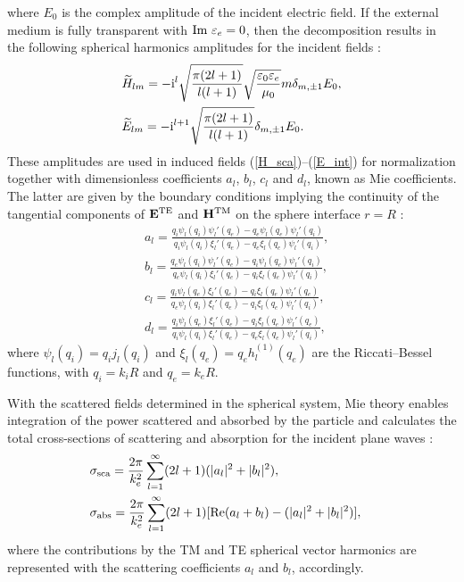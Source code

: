 \documentclass[aps,prb,reprint]{revtex4-2}
\renewcommand{\vec}[1]{{\bf #1}}
\renewcommand{\i}{{\rm i}}
\begin{document}
where $E_0$ is the complex amplitude of the incident electric field. If the external medium is fully transparent with ${\rm Im}~\varepsilon_e=0$, then the decomposition results in the following spherical harmonics amplitudes for the incident fields \cite{Li:2014}: 
\begin{eqnarray}
	&\displaystyle 
	\widetilde{H}_{lm}=-\i ^{l}\sqrt{\frac{\pi(2l+1)}{l(l+1)}}\sqrt\frac{\varepsilon_0\varepsilon_e}{\mu_0}m\delta_{m,\pm1}E_0,\\
	&\displaystyle
	\widetilde{E}_{lm}=-\i ^{l+1}\sqrt{\frac{\pi(2l+1)}{l(l+1)}}\delta_{m,\pm1}E_0.
\end{eqnarray}
These amplitudes are used in induced fields (\ref{H_sca})--(\ref{E_int}) for normalization together with dimensionless  coefficients $a_{l}$, $b_{l}$, $c_{l}$ and $d_{l}$, known as Mie coefficients. The latter are given by the boundary conditions implying the continuity of the tangential components of $\vec E^{\rm TE}$ and $\vec H^{\rm TM}$ on the sphere interface $r=R$ \cite{Stratton:2007,Jackson:1999,Bohren:1998}:
\begin{eqnarray}
	&\displaystyle 
	a_{l}=\frac{q_i\psi_l(q_i)\psi_l'(q_e)-q_e\psi_l(q_e)\psi_l'(q_i)}
	{q_i\psi_l(q_i)\xi_l'(q_e)-q_e\xi_l(q_e)\psi_l'(q_i)},
\label{S:a_l}\\
	&\displaystyle 
	b_{l}=\frac{q_e\psi_l(q_i)\psi_l'(q_e)-q_i\psi_l(q_e)\psi_l'(q_i)}
	{q_e\psi_l(q_i)\xi_l'(q_e)-q_i\xi_l(q_e)\psi_l'(q_i)},
\label{S:b_l}\\
	&\displaystyle 
	c_{l}=\frac{q_i\psi_l(q_e)\xi_l'(q_e)-q_i\xi_l(q_e)\psi_l'(q_e)}
	{q_e\psi_l(q_i)\xi_l'(q_e)-q_i\xi_l(q_e)\psi_l'(q_i)},
\label{S:c_l}\\
	&\displaystyle 
	d_{l}=\frac{q_i\psi_l(q_e)\xi_l'(q_e)-q_i\xi_l(q_e)\psi_l'(q_e)}
	{q_i\psi_l(q_i)\xi_l'(q_e)-q_e\xi_l(q_e)\psi_l'(q_i)},
\label{S:d_l}
\end{eqnarray}
where $\psi_l(q_i)=q_ij_l(q_i)$ and $\xi_l(q_e)=q_eh_l^{(1)}(q_e)$ are the Riccati--Bessel functions, with $q_i=k_i R$ and $q_e=k_e R$.

With the scattered fields determined in the spherical system, Mie theory enables integration of the power scattered and absorbed by the particle and calculates the total cross-sections of scattering and absorption for the incident plane waves \cite{Stratton:2007,Jackson:1999,Bohren:1998}: 
\begin{eqnarray}
	&\displaystyle 
	\sigma_{\rm sca}=
	\frac{2\pi}{k_e^2}\sum\limits_{l=1}^\infty 
	(2l+1)(|a_l|^2+|b_l|^2),\label{sigma_sca}
\\
	&\displaystyle 
	\sigma_{\rm abs}=
	\frac{2\pi}{k_e^2}\sum\limits_{l=1}^\infty 
	(2l+1)[{\rm Re}(a_l+b_l)-(|a_l|^2+|b_l|^2)],~~~\label{sigma_abs}
\end{eqnarray} 
where the contributions by the TM and TE spherical vector harmonics are represented with the scattering coefficients $a_l$ and $b_l$, accordingly. 
\end{document}
